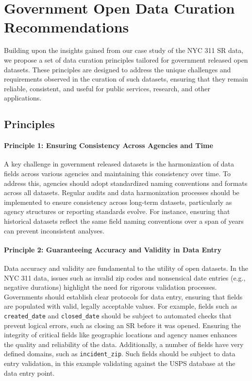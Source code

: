 \documentclass[linenumber]{jdsart}
\begin{document}
\section{Government Open Data Curation Recommendations}
\label{sec:recommendations}
Building upon the insights gained from our case study of the 
NYC 311 SR data, we propose a set of data 
curation principles tailored for government released open datasets. 
These principles are designed to address the unique challenges 
and requirements observed in the curation of such datasets, 
ensuring that they remain reliable, consistent, and useful for 
public services, research, and other applications.

\subsection{Principles}
\paragraph{Principle 1: Ensuring Consistency Across Agencies and Time}
A key challenge in government released datasets is the 
harmonization of data fields across various agencies and 
maintaining this consistency over time. To address this, agencies should adopt 
standardized naming conventions and formats across all datasets. 
Regular audits and data harmonization processes should be 
implemented to ensure consistency across long\mbox{-}term datasets, 
particularly as agency structures or reporting standards evolve. 
For instance, ensuring that historical datasets reflect the same 
field naming conventions over a span of years can prevent 
inconsistent analyses.

\paragraph{Principle 2: Guaranteeing Accuracy and Validity in Data Entry}
Data accuracy and validity are fundamental to the utility of 
open datasets. In the NYC 311 data, issues such as 
invalid zip codes and 
nonsensical date entries (e.g., negative durations) highlight the need 
for rigorous validation processes. Governments should establish 
clear protocols for data entry, ensuring that fields are populated with 
valid, legally acceptable values. For example, fields such as 
\texttt{created\_date} and \texttt{closed\_date} should be subject to 
automated checks that prevent logical errors, such as closing an 
SR before it was opened. Ensuring the integrity of critical fields 
like geographic locations and agency names enhances the quality 
and reliability of the data. Additionally, a number of fields have 
very defined domains, such as \texttt{incident\_zip}. Such fields
should be subject to data entry validation, in this example
validating against the USPS database at the data entry point.
\end{document}
